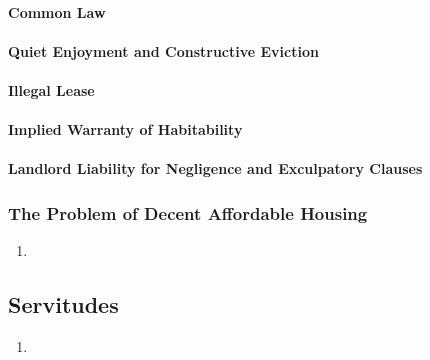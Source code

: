 \paragraph{Common Law} %
\paragraph{Quiet Enjoyment and Constructive Eviction} %
\paragraph{Illegal Lease} %
\paragraph{Implied Warranty of Habitability} %
\paragraph{Landlord Liability for Negligence and Exculpatory Clauses}

\subsubsection{The Problem of Decent Affordable Housing} %

\begin{enumerate}
    \item %
\end{enumerate}

\subsection{Servitudes}

\begin{enumerate}
    \item %
\end{enumerate}
